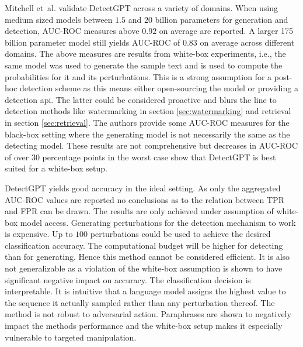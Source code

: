     Mitchell et~al. \cite{mitchell2023detectgpt} validate DetectGPT across a variety of domains.
    When using medium sized models between $1.5$ and $20$ billion parameters for generation and detection, AUC-ROC measures above $0.92$ on average are reported.
    A larger 175 billion parameter model still yields AUC-ROC of $0.83$ on average across different domains.
    The above measures are results from white-box experiments, i.e., the same model was used to generate the sample text and is used to compute the probabilities for it and its perturbations.
    This is a strong assumption for a post-hoc detection scheme as this means either open-sourcing the model or providing a detection \ac{api}.
    The latter could be considered proactive and blurs the line to detection methods like watermarking in section \ref{sec:watermarking} and retrieval in section \ref{sec:retrieval}.
    The authors provide some AUC-ROC measures for the black-box setting where the generating model is not necessarily the same as the detecting model.
    These results are not comprehensive but decreases in AUC-ROC of over $30$ percentage points in the worst case show that DetectGPT is best suited for a white-box setup.

    \begin{analysis}
        DetectGPT yields good accuracy in the ideal setting.
        As only the aggregated AUC-ROC values are reported no conclusions as to the relation between TPR and FPR can be drawn.
        The results are only achieved under assumption of white-box model access.
        Generating perturbations for the detection mechanism to work is expensive.
        Up to $100$ perturbations could be used to achieve the desired classification accuracy.
        The computational budget will be higher for detecting than for generating.
        Hence this method cannot be considered efficient.
        It is also not generalizable as a violation of the white-box assumption is shown to have significant negative impact on accuracy.
        The classification decision is interpretable.
        It is intuitive that a language model assigns the highest value to the sequence it actually sampled rather than any perturbation thereof.
        The method is not robust to adversarial action.
        Paraphrases are shown to negatively impact the methods performance and the white-box setup makes it especially vulnerable to targeted manipulation.
    \end{analysis}

